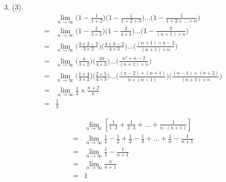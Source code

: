 \begin{solve*}3. (3).
	\begin{align*}
		&\lim_{n\rightarrow\infty}\Big(1-\frac{1}{1+2}\Big)\Big(1-\frac{1}{1+2+3}\Big)\dots\Big(1-\frac{1}{1+2+\dots+n}\Big)\\
		=&\lim_{n\rightarrow\infty}\Big(1-\frac{2}{3\times2}\Big)\Big(1-\frac{2}{4\times3}\Big)\dots\Big(1-\frac{2}{(n+1)\times{n}}\Big)\\
		=&\lim_{n\rightarrow\infty}\Big(\frac{3\times2-2}{3\times2}\Big)\Big(\frac{4\times3-2}{4\times3}\Big)\dots\Big(\frac{(n+1)\times{n}-2}{(n+1)\times{n}}\Big)\\
		=&\lim_{n\rightarrow\infty}\Big(\frac{4}{3\times2}\Big)\Big(\frac{10}{4\times3}\Big)\dots\Big(\frac{n^2+n-2}{(n+1)\times{n}}\Big)\\
		=&\lim_{n\rightarrow\infty}\Big(\frac{1\times4}{3\times2}\Big)\Big(\frac{2\times5}{4\times3}\Big)\dots\Big(\frac{(n-2)\times(n+1)}{n\times(n-1)}\Big)\Big(\frac{(n-1)\times(n+2)}{(n+1)\times{n}}\Big)\\
		=&\lim_{n\rightarrow\infty}\frac{1}{3}\times\frac{n+2}{n}\\
		=&\frac{1}{3}
	\end{align*}	
\end{solve*}

\begin{align*}
	&\lim_{n\rightarrow\infty}[\frac{1}{1\cdot2}+\frac{1}{2\cdot3}+\dots+\frac{1}{n\cdot(n+1)}]\\
	=&\lim_{n\rightarrow\infty} \frac{1}{1}-\frac{1}{2}+\frac{1}{2}-\frac{1}{3}+\dots+\frac{1}{n}-\frac{1}{n+1}\\
	=&\lim_{n\rightarrow\infty}\frac{1}{1}-\frac{1}{n+1}\\
	=&\lim_{n\rightarrow\infty}\frac{n}{n+1}\\
	=&1
\end{align*}

